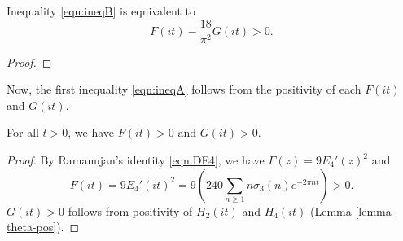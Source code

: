 \begin{lemma}\label{lem:ineqBnew}
Inequality \eqref{eqn:ineqB} is equivalent to
\begin{equation}\label{eqn:ineqBnew}
  F(it) - \frac{18}{\pi^2} G(it) > 0.
\end{equation}
\end{lemma}
\begin{proof}

\end{proof}

Now, the first inequality \eqref{eqn:ineqA} follows from the positivity of each $F(it)$ and $G(it)$.

\begin{lemma}
For all $t > 0$, we have $F(it) > 0$ and $G(it) > 0$.
\end{lemma}
\begin{proof}
By Ramanujan's identity \eqref{eqn:DE4}, we have $F(z) = 9 E_4'(z)^2$ and
\begin{equation}
  F(it) = 9E_4'(it)^2 = 9 \left(240\sum_{n \geq 1} n \sigma_3(n) e^{-2 \pi n t} \right) > 0.
\end{equation}
$G(it) > 0$ follows from positivity of $H_2(it)$ and $H_4(it)$ (Lemma \ref{lemma-theta-pos}).
\end{proof}

